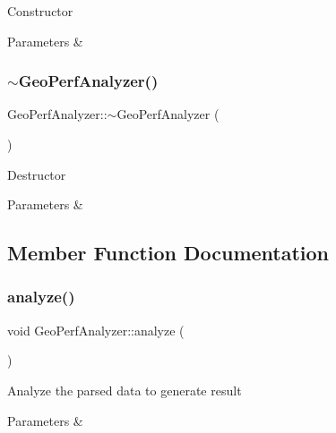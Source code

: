 Constructor


\begin{DoxyParams}{Parameters}
{\em } & \\
\hline
\end{DoxyParams}
\mbox{\label{class_geo_perf_analyzer_a91e810c076f5a79577698240af7c8dfd}} 
\subsubsection{\texorpdfstring{$\sim$\+Geo\+Perf\+Analyzer()}{~GeoPerfAnalyzer()}}
{\footnotesize\ttfamily Geo\+Perf\+Analyzer\+::$\sim$\+Geo\+Perf\+Analyzer (\begin{DoxyParamCaption}{ }\end{DoxyParamCaption})\hspace{0.3cm}{\ttfamily [default]}}

Destructor


\begin{DoxyParams}{Parameters}
{\em } & \\
\hline
\end{DoxyParams}


\subsection{Member Function Documentation}
\mbox{\label{class_geo_perf_analyzer_af62a34fd2e518e4505512318d2e56410}} 
\subsubsection{\texorpdfstring{analyze()}{analyze()}}
{\footnotesize\ttfamily void Geo\+Perf\+Analyzer\+::analyze (\begin{DoxyParamCaption}{ }\end{DoxyParamCaption})\hspace{0.3cm}{\ttfamily [virtual]}}

Analyze the parsed data to generate result


\begin{DoxyParams}{Parameters}
{\em } & \\
\hline
\end{DoxyParams}


